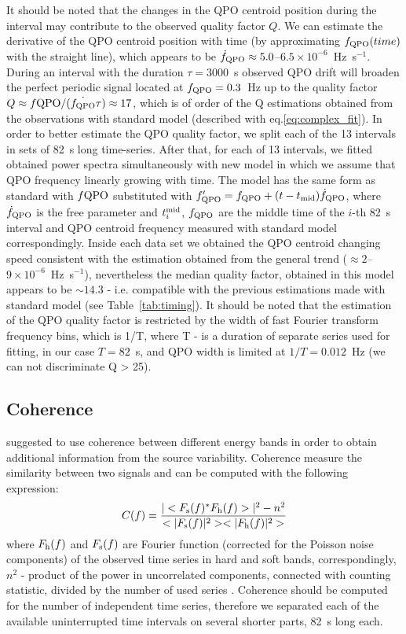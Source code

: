 \documentclass[a4paper,fleqn,usenatbib]{mnras}
\begin{document}
It should be noted that the changes in the QPO centroid position during the interval may contribute to the observed quality factor $Q$.
We can estimate the derivative of the QPO centroid position with time (by approximating $f_{\rm QPO}(time)$ with the straight line), which appears to be $\dot{f}_{\rm QPO} \approx 5.0$--$6.5\times10^{-6}$~Hz~s$^{-1}$. 
During an interval with the duration $\tau = 3000$~s observed QPO drift will broaden the perfect periodic signal located at $f_{\rm QPO}=0.3$~Hz up to the quality factor $Q \approx f{\rm QPO}/(\dot{f_{\rm QPO}}\tau) \approx 17$, which is of order of the Q estimations obtained from the observations with standard model (described with eq.\ref{eq:complex_fit}).
In order to better estimate the QPO quality factor, we split each of the 13 intervals in sets of 82~s long time-series. 
After that, for each of 13 intervals, we fitted obtained power spectra simultaneously with new model in which we assume that QPO frequency linearly growing with time. 
The model has the same form as standard with $f{\rm QPO}$ substituted with $f_{\rm QPO}' = f_{\rm QPO} + (t - t_{\rm mid})\dot{f}_{\rm QPO}$, where $\dot{f}_{\rm QPO}$ is the free parameter and $t_{i}^{\rm mid}$, $f_{\rm QPO}$ are the middle time of the $i$-th 82~s interval and QPO centroid frequency measured with standard model correspondingly.
Inside each data set we obtained the QPO centroid changing speed consistent with the estimation obtained from the general trend ($\approx 2$--$9\times10^{-6}$~Hz~s$^{-1}$), nevertheless the median quality factor, obtained in this model appears to be $\sim14.3$ - i.e. compatible with the previous estimations made with standard model (see Table~\ref{tab:timing}). 
It should be noted that the estimation of the QPO quality factor is restricted by the width of fast Fourier transform frequency bins, which is 1/T, where T - is a duration of separate series used for fitting, in our case $T=82$~s, and QPO width is limited at $1/T = 0.012$~Hz (we can not discriminate Q > 25).

\subsection{Coherence}

\citet{1997ApJ...474L..43V} suggested to use coherence between different energy bands in order to obtain additional information from the source variability. 
Coherence measure the similarity between two signals and can be computed with the following expression:
\begin{equation}
        C(f) = \frac{|<F_{\rm s}(f)^*F_{\rm h}(f)>|^2 - n^2}{<|F_{\rm s}(f)|^2><|F_{\rm h}(f)|^2>}
    \label{eq:nowak_coh}
\end{equation}
where $F_{\rm h}(f)$ and $F_{\rm s}(f)$ are Fourier function (corrected for the Poisson noise components) of the observed time series in hard and soft bands, correspondingly, 
$n^2$ - product of the power in uncorrelated components, connected with counting statistic, divided by the number of used series \citep{1997ApJ...474L..43V}. 
Coherence should be computed for the number of independent time series, therefore we separated each of the available uninterrupted time intervals on several shorter parts, 82~s long each.  
\end{document}
